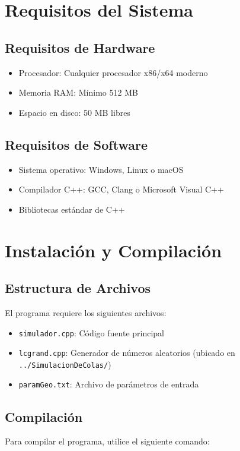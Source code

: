 \documentclass{article}
\begin{document}
\section{Requisitos del Sistema}

\subsection{Requisitos de Hardware}
\begin{itemize}
    \item Procesador: Cualquier procesador x86/x64 moderno
    \item Memoria RAM: Mínimo 512 MB
    \item Espacio en disco: 50 MB libres
\end{itemize}

\subsection{Requisitos de Software}
\begin{itemize}
    \item Sistema operativo: Windows, Linux o macOS
    \item Compilador C++: GCC, Clang o Microsoft Visual C++
    \item Bibliotecas estándar de C++
\end{itemize}

\section{Instalación y Compilación}

\subsection{Estructura de Archivos}
El programa requiere los siguientes archivos:
\begin{itemize}
    \item \texttt{simulador.cpp}: Código fuente principal
    \item \texttt{lcgrand.cpp}: Generador de números aleatorios (ubicado en \texttt{../SimulacionDeColas/})
    \item \texttt{paramGeo.txt}: Archivo de parámetros de entrada
\end{itemize}

\subsection{Compilación}
Para compilar el programa, utilice el siguiente comando:
\end{document}
